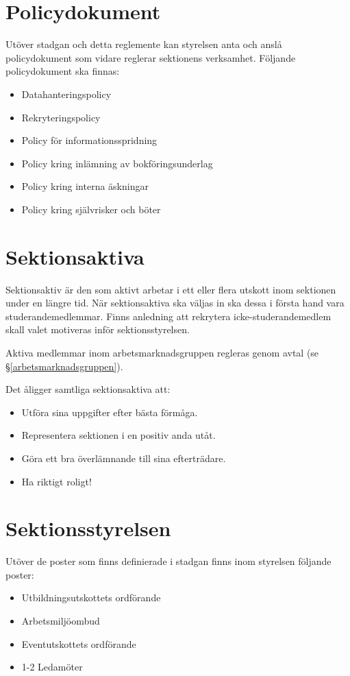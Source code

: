 \documentclass{datateknologsektionen-document}
\begin{document}
\pagebreak
\tableofcontents

\pagebreak

\section{Policydokument}
Utöver stadgan och detta reglemente kan styrelsen anta och anslå policydokument som
vidare reglerar sektionens verksamhet. Följande policydokument ska finnas:
\begin{itemize}
  \item Datahanteringspolicy
  \item Rekryteringspolicy
  \item Policy för informationsspridning
  \item Policy kring inlämning av bokföringsunderlag
\item Policy kring interna äskningar
  \item Policy kring självrisker och böter
\end{itemize}

\section{Sektionsaktiva}
Sektionsaktiv är den som aktivt arbetar i ett eller flera utskott inom sektionen under en längre tid.
När sektionsaktiva ska väljas in ska dessa i första hand vara studerandemedlemmar.
Finns anledning att rekrytera icke-studerandemedlem skall valet motiveras inför
sektionsstyrelsen.

Aktiva medlemmar inom arbetsmarknadsgruppen regleras genom avtal (se \S \ref{arbetsmarknadsgruppen}).

Det åligger samtliga sektionsaktiva att:
\begin{itemize}
  \item Utföra sina uppgifter efter bästa förmåga.
  \item Representera sektionen i en positiv anda utåt.
  \item Göra ett bra överlämnande till sina efterträdare.
  \item Ha riktigt roligt!
\end{itemize}

\section{Sektionsstyrelsen}
Utöver de poster som finns definierade i stadgan finns inom styrelsen följande poster:
\begin{itemize}
  \item Utbildningsutskottets ordförande
  \item Arbetsmiljöombud
  \item Eventutskottets ordförande
  \item 1-2 Ledamöter
\end{itemize}
\end{document}
